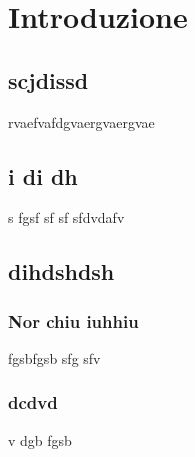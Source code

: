 \section{Introduzione}
	\subsection{scjdissd}
	rvaefvafdgvaergvaergvae
	\subsection{ i di dh}
	 s fgsf sf sf sfdvdafv
	\subsection{dihdshdsh}
		\subsubsection{Nor chiu iuhhiu}
		fgsbfgsb sfg sfv 
		\subsubsection{dcdvd}
		v dgb fgsb
		



